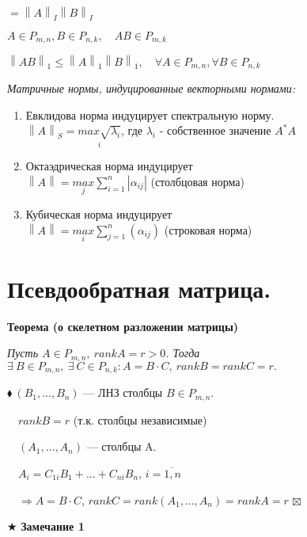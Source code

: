 \documentclass[a4paper, 12pt]{report}
\begin{document}
	$=\left \| A \right \|_I \left \| B \right \|_I $
	\par\bigskip
	$A \in P_{m,n}, B \in P_{n,k}, \quad AB \in P_{m,k}$
	\par\bigskip
	$\left \| AB \right \|_1 \leqslant \left \| A \right \|_1\left \| B \right \|_1,\quad\forall A \in P_{m,n}, \forall B \in P_{n,k}$
	\par\bigskip
	\textit{Матричные нормы, индуцированные векторными нормами:}
	\begin{enumerate}
		\item Евклидова норма индуцирует спектральную норму.\\
		$\left \| A \right \|_S = \underset{i} {max \sqrt{\lambda_i}}$, где $\lambda_i$ - собственное значение $A^*A$
		\item Октаэдрическая норма индуцирует\\
		$\left \| A \right \| = \underset{j} {max}\sum\limits_{i=1}^{n}|\alpha_{ij}|$ (столбцовая норма)
		\item Кубическая норма индуцирует\\
		$\left \| A \right \| = \underset{i} {max}\sum\limits_{j=1}^{n}(\alpha_{ij})$ (строковая норма)
	\end{enumerate}
	
	
	
	
	
	
	
	
	
	
	\section{Псевдообратная матрица.}
	
	\quad\;\textbf{ Теорема (о скелетном разложении матрицы)}
	
	\textit{Пусть $A \in P_{m,n},\ rank A = r>0$. Тогда $\exists\ B \in P_{m,n},\ \exists\ C \in P_{n, k}: A = B \cdot C,\ rank B = rank C = r.$}
	\par\bigskip
	$\blacklozenge\ (B_1, ..., B_n)$ --- ЛНЗ столбцы $B \in P_{m,n}$.
	
	$\quad rank B = r$ (т.к. столбцы независимые)
	
	$\quad (A_1, ..., A_n)$ --- столбцы A.
	
	$\quad A_i=C_{1i}B_1 + ... + C_{ni}B_{n}$, $i=\overline{1, n}$
	
	$\quad\Rightarrow A=B\cdot C$, $rank C = rank(A_1, ..., A_n) = rank A = r$
	$\boxtimes$
	\par\bigskip
	$\bigstar$\textbf{ Замечание 1}
	
\end{document}
